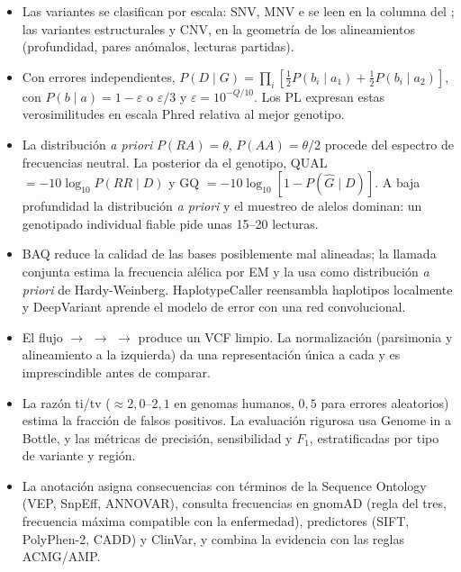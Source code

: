 \begin{resumen}
\begin{itemize}
  \item Las variantes se clasifican por escala: SNV, MNV e  se leen en la columna del ; las variantes estructurales y CNV, en la geometría de los alineamientos (profundidad, pares anómalos, lecturas partidas).
  \item Con errores independientes, $P(D\mid G)=\prod_i[\tfrac12P(b_i\mid a_1)+\tfrac12P(b_i\mid a_2)]$, con $P(b\mid a)=1-\varepsilon$ o $\varepsilon/3$ y $\varepsilon=10^{-Q/10}$. Los PL expresan estas verosimilitudes en escala Phred relativa al mejor genotipo.
  \item La distribución \emph{a priori} $P(RA)=\theta$, $P(AA)=\theta/2$ procede del espectro de frecuencias neutral. La posterior da el genotipo, QUAL $=-10\log_{10}P(RR\mid D)$ y GQ $=-10\log_{10}[1-P(\hat G\mid D)]$. A baja profundidad la distribución \emph{a priori} y el muestreo de alelos dominan: un genotipado individual fiable pide unas 15--20 lecturas.
  \item BAQ reduce la calidad de las bases posiblemente mal alineadas; la llamada conjunta estima la frecuencia alélica por EM y la usa como distribución \emph{a priori} de Hardy-Weinberg. HaplotypeCaller reensambla haplotipos localmente y DeepVariant aprende el modelo de error con una red convolucional.
  \item El flujo  $\to$  $\to$  $\to$  produce un VCF limpio. La normalización (parsimonia y alineamiento a la izquierda) da una representación única a cada  y es imprescindible antes de comparar.
  \item La razón ti/tv ($\approx2{,}0$--$2{,}1$ en genomas humanos, $0{,}5$ para errores aleatorios) estima la fracción de falsos positivos. La evaluación rigurosa usa Genome in a Bottle,  y las métricas de precisión, sensibilidad y $F_1$, estratificadas por tipo de variante y región.
  \item La anotación asigna consecuencias con términos de la Sequence Ontology (VEP, SnpEff, ANNOVAR), consulta frecuencias en gnomAD (regla del tres, frecuencia máxima compatible con la enfermedad), predictores (SIFT, PolyPhen-2, CADD) y ClinVar, y combina la evidencia con las reglas ACMG/AMP.
\end{itemize}
\end{resumen}

